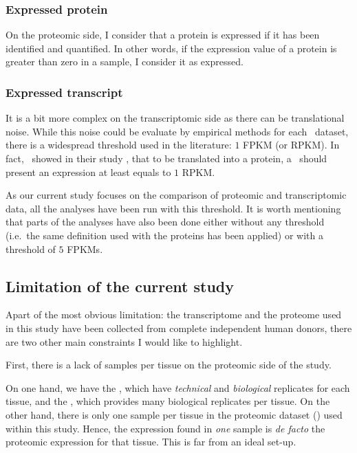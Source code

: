 \subsubsection{Expressed protein}
On the proteomic side, I consider that a protein is expressed if it has been
identified and quantified. In other words, if the expression value of a protein
is greater than zero in a sample, I consider it as expressed.

\subsubsection{Expressed transcript}
It is a bit more complex on the transcriptomic side as there can be
translational noise. While this noise could be evaluate by empirical methods for
each \Rnaseq\ dataset, there is a widespread threshold used in the literature:
$1$ \gls{FPKM} (or \gls{RPKM}). In fact,~\cite{Hebenstreit:2011} showed in
their study , that to be translated into a protein, a \mRNA\ should
present an expression at least equals to $1$ \gls{RPKM}.

As our current study focuses on the comparison of proteomic and transcriptomic
data, all the analyses have been run with this threshold. It is worth mentioning
that parts of the analyses have also been done either without
any threshold (i.e.\ the same definition used with the proteins has been applied)
or with a threshold of $5$ \glspl{FPKM}.


\subsection{Limitation of the current study}

Apart of the most obvious limitation: the transcriptome and the proteome used in
this study have been collected from complete independent human donors, there are
two other main constraints I would like to highlight.

First, there is a lack of samples per tissue on the proteomic side of the study.

On one hand, we have the , which have \emph{technical}
and \emph{biological} replicates for each tissue, and the , which
provides many biological replicates per tissue. On the other hand, there is only
one sample per tissue in the proteomic dataset () used
within this study. Hence, the expression found in \emph{one} sample is
\textit{de facto} the proteomic expression for that tissue. This
is far from an ideal set-up.


